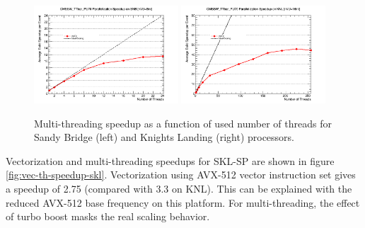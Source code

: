 \documentclass{webofc}
\def\twop{0.48\textwidth}
\def\postfigskip{\vskip-4mm}
\begin{document}
\begin{figure}[htb]
  \centering
  \includegraphics[width=\twop]{figs/comp/SNB_CMSSW_TTbar_PU70_TH_speedup.png}
  \hfill
  \includegraphics[width=\twop]{figs/comp/KNL_CMSSW_TTbar_PU70_TH_speedup.png}
  \postfigskip

  \caption{Multi-threading speedup as a function of used number of threads for Sandy
    Bridge (left) and Knights Landing (right) processors.}
  \label{fig:th-speedup}
\end{figure}

Vectorization and multi-threading speedups for SKL-SP are shown in figure
\ref{fig:vec-th-speedup-skl}. Vectorization using AVX-512 vector instruction
set gives a speedup of 2.75 (compared with 3.3 on KNL). This can be explained
with the reduced AVX-512 base frequency on this platform. For multi-threading,
the effect of turbo boost masks the real scaling behavior.
\end{document}
